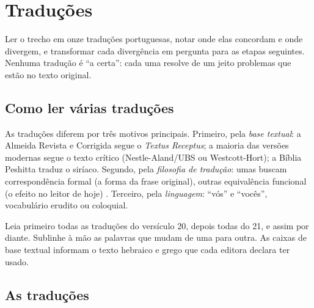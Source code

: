 \chapter{Traduções}\label{cap:traducoes}

\begin{objetivo}
Ler o trecho em onze traduções portuguesas, notar onde elas concordam e onde
divergem, e transformar cada divergência em pergunta para as etapas seguintes.
Nenhuma tradução é \enquote{a certa}: cada uma resolve de um jeito problemas que
estão no texto original.
\end{objetivo}

\section{Como ler várias traduções}

As traduções diferem por três motivos principais. Primeiro, pela \emph{base
textual}: a Almeida Revista e Corrigida segue o \emph{Textus Receptus}; a
maioria das versões modernas segue o texto crítico (Nestle-Aland/UBS ou
Westcott-Hort); a Bíblia Peshitta traduz o siríaco. Segundo, pela
\emph{filosofia de tradução}: umas buscam correspondência formal (a forma da
frase original), outras equivalência funcional (o efeito no leitor de hoje)
\parencite{feestuart2014}. Terceiro, pela \emph{linguagem}: \enquote{vós}
e \enquote{vocês}, vocabulário erudito ou coloquial.

\begin{nota}
Leia primeiro todas as traduções do versículo 20, depois todas do 21, e assim
por diante. Sublinhe à mão as palavras que mudam de uma para outra. As
caixas de base textual informam o texto hebraico e grego que cada editora
declara ter usado.
\end{nota}

\section{As traduções}

